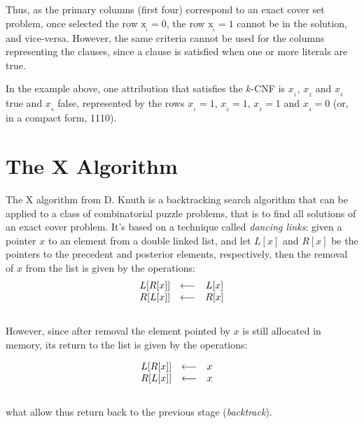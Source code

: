 \documentclass[12pt]{article}
\begin{document}
Thus, as the primary columns (first four) correspond to an exact cover set problem, once selected the row $\mathrm{x_{_i} = 0}$, the row $\mathrm{x_{_i} = 1}$ cannot be in the solution, and vice-versa.
However, the same criteria cannot be used for the columns representing the clauses, since a clause is satisfied when one or more literals are true.

In the example above, one attribution that satisfies the $k$-CNF is $x_{_1}$, $x_{_2}$ and $x_{_3}$ true and $x_{_4}$ false, represented by the rows $x_{_1} = 1$, $x_{_2} = 1$, $x_{_3} = 1$ and $x_{_4} = 0$ (or, in a compact form, 1110).



\section{The X Algorithm}
\label{sec:algX}

The X algorithm from D. Knuth \cite{knuthDLX} is a backtracking search algorithm that can be applied to a class of combinatorial puzzle problems, that is to find all solutions of an exact cover problem.
It's based on a technique called \emph{dancing links}: given a pointer $x$ to an element from a double linked list, and let $L{\left[ x \right]}$ and $R{\left[ x \right]}$ be the pointers to the precedent and posterior elements, respectively, then the removal of $x$ from the list is given by the operations:
\\[-5pt]
\begin{displaymath}
  \begin{array}{c c c}
    L{\left[ R{\left[ x \right]} \right]} & \longleftarrow & L{\left[ x \right]} \\
    R{\left[ L{\left[ x \right]} \right]} & \longleftarrow & R{\left[ x \right]}
  \end{array}
\end{displaymath}
\\[-25pt]

However, since after removal the element pointed by $x$ is still allocated in memory, its return to the list is given by the operations:

\begin{displaymath}
  \begin{array}{c c c}
    L{\left[ R{\left[ x \right]} \right]} & \longleftarrow & x \quad \\
    R{\left[ L{\left[ x \right]} \right]} & \longleftarrow & x \quad
  \end{array}
\end{displaymath}
\\
what allow thus return back to the previous stage (\emph{backtrack}).
\end{document}

